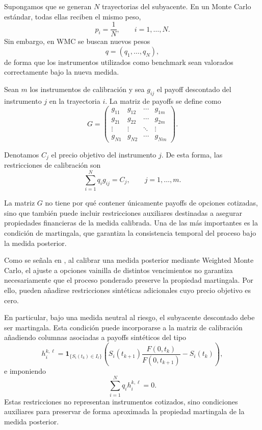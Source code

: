 Supongamos que se generan \(N\) trayectorias del subyacente. En un Monte Carlo estándar, todas ellas reciben el mismo peso,
\[
p_i=\frac{1}{N}, \qquad i=1,\ldots,N.
\]
Sin embargo, en WMC se buscan nuevos pesos
\[
q=(q_1,\ldots,q_N),
\]
de forma que los instrumentos utilizados como benchmark sean valorados correctamente bajo la nueva medida.

Sean \(m\) los instrumentos de calibración y sea \(g_{ij}\) el payoff descontado del instrumento \(j\) en la trayectoria \(i\). La matriz de payoffs se define como
\begin{equation}
\label{matriz_payoffs_MRE}
  G=
\begin{pmatrix}
g_{11} & g_{12} & \cdots & g_{1m}\\
g_{21} & g_{22} & \cdots & g_{2m}\\
\vdots & \vdots & \ddots & \vdots\\
g_{N1} & g_{N2} & \cdots & g_{Nm}
\end{pmatrix}.  
\end{equation}


Denotamos \(C_j\) el precio objetivo del instrumento \(j\). De esta forma, las restricciones de calibración son
\[
\sum_{i=1}^N q_i g_{ij}=C_j,
\qquad j=1,\ldots,m.
\]

La matriz \(G\) no tiene por qué contener únicamente payoffs de opciones cotizadas, sino que también puede incluir restricciones auxiliares destinadas a asegurar propiedades financieras de la medida calibrada. Una de las más importantes es la condición de martingala, que garantiza la consistencia temporal del proceso bajo la medida posterior.

\begin{observation}
    Como se señala en \cite{articleElices}, al calibrar una medida posterior mediante Weighted Monte Carlo, el ajuste a opciones vainilla de distintos vencimientos no garantiza necesariamente que el proceso ponderado preserve la propiedad martingala. Por ello, pueden añadirse restricciones sintéticas adicionales cuyo precio objetivo es cero.

En particular, bajo una medida neutral al riesgo, el subyacente descontado debe ser martingala. Esta condición puede incorporarse a la matriz de calibración añadiendo columnas asociadas a payoffs sintéticos del tipo
\[
h_i^{k,\ell}
=
\mathbf{1}_{\{S_i(t_k)\in I_\ell\}}
\left(
S_i(t_{k+1})
\frac{F(0,t_k)}{F(0,t_{k+1})}
-
S_i(t_k)
\right),
\]
e imponiendo
\[
\sum_{i=1}^N q_i h_i^{k,\ell}=0.
\]
Estas restricciones no representan instrumentos cotizados, sino condiciones auxiliares para preservar de forma aproximada la propiedad martingala de la medida posterior.
\end{observation}

